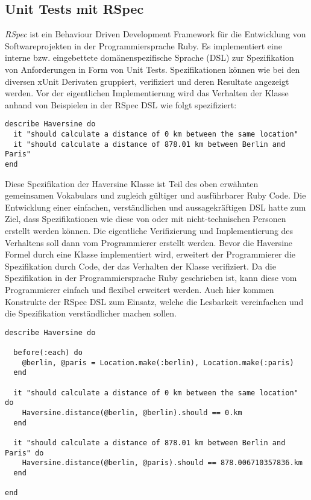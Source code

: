 \subsection{Unit Tests mit RSpec}

\textit{RSpec} \cite{rspec} ist ein Behaviour Driven Development
Framework für die Entwicklung von Softwareprojekten in der
Programmiersprache Ruby.  Es implementiert eine interne
bzw. eingebettete domänen\-spezifische Sprache (DSL) zur Spezifikation
von Anforderungen in Form von Unit Tests.  Spezifikationen können wie
bei den diversen xUnit Derivaten gruppiert, verifiziert und deren
Resultate angezeigt werden. Vor der eigentlichen Implementierung wird
das Verhalten der Klasse anhand von Beispielen in der RSpec DSL wie
folgt spezifiziert:

{\footnotesize
\begin{verbatim}
describe Haversine do
  it "should calculate a distance of 0 km between the same location"
  it "should calculate a distance of 878.01 km between Berlin and Paris"
end
\end{verbatim}
}

Diese Spezifikation der Haversine Klasse ist Teil des oben erwähnten
gemeinsamen Vokabulars und zugleich gültiger und ausführbarer Ruby
Code. Die Entwicklung einer einfachen, verständlichen und
aussagekräftigen DSL hatte zum Ziel, dass Spezifikationen wie diese
von oder mit nicht-technischen Personen erstellt werden können. Die
eigentliche Verifizierung und Implementierung des Verhaltens soll dann
vom Programmierer erstellt werden. Bevor die Haversine Formel durch
eine Klasse implementiert wird, erweitert der Programmierer die
Spezifikation durch Code, der das Verhalten der Klasse verifiziert. Da
die Spezifikation in der Programmiersprache Ruby geschrieben ist, kann
diese vom Programmierer einfach und flexibel erweitert werden. Auch
hier kommen Konstrukte der RSpec DSL zum Einsatz, welche die
Lesbarkeit vereinfachen und die Spezifikation verständlicher machen
sollen.

{\footnotesize
\begin{verbatim}
describe Haversine do

  before(:each) do
    @berlin, @paris = Location.make(:berlin), Location.make(:paris)
  end

  it "should calculate a distance of 0 km between the same location" do
    Haversine.distance(@berlin, @berlin).should == 0.km
  end

  it "should calculate a distance of 878.01 km between Berlin and Paris" do
    Haversine.distance(@berlin, @paris).should == 878.006710357836.km
  end

end
\end{verbatim}
}

